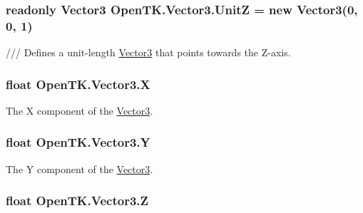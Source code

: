 \hypertarget{struct_open_t_k_1_1_vector3_acc3b909cd51e4989e798052ed5c5d327}{
\subsubsection[{Unit\-Z}]{\setlength{\rightskip}{0pt plus 5cm}readonly {\bf Vector3} Open\-T\-K.\-Vector3.\-Unit\-Z = new {\bf Vector3}(0, 0, 1)\hspace{0.3cm}{\ttfamily [static]}}}\label{struct_open_t_k_1_1_vector3_acc3b909cd51e4989e798052ed5c5d327}


/// Defines a unit-\/length \hyperlink{struct_open_t_k_1_1_vector3}{Vector3} that points towards the Z-\/axis. 

\hypertarget{struct_open_t_k_1_1_vector3_aa5d71ea5b15826145ddd9606235aa4f5}{
\subsubsection[{X}]{\setlength{\rightskip}{0pt plus 5cm}float Open\-T\-K.\-Vector3.\-X}}\label{struct_open_t_k_1_1_vector3_aa5d71ea5b15826145ddd9606235aa4f5}


The X component of the \hyperlink{struct_open_t_k_1_1_vector3}{Vector3}. 

\hypertarget{struct_open_t_k_1_1_vector3_ae8f1c909251ac095a9baff7bdd7b185c}{
\subsubsection[{Y}]{\setlength{\rightskip}{0pt plus 5cm}float Open\-T\-K.\-Vector3.\-Y}}\label{struct_open_t_k_1_1_vector3_ae8f1c909251ac095a9baff7bdd7b185c}


The Y component of the \hyperlink{struct_open_t_k_1_1_vector3}{Vector3}. 

\hypertarget{struct_open_t_k_1_1_vector3_a1fc1f991eabe71caaafeab3585f658e0}{
\subsubsection[{Z}]{\setlength{\rightskip}{0pt plus 5cm}float Open\-T\-K.\-Vector3.\-Z}}\label{struct_open_t_k_1_1_vector3_a1fc1f991eabe71caaafeab3585f658e0}


